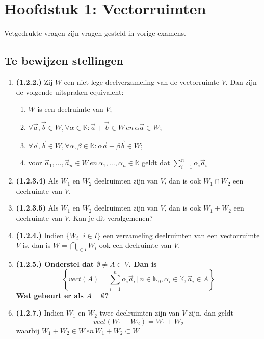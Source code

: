 \documentclass[12pt]{article}
\begin{document}
\date{}    
\maketitle
    \section*{Hoofdstuk 1: Vectorruimten}
    Vetgedrukte vragen zijn vragen gesteld in vorige examens.
    \subsection*{Te bewijzen stellingen}
    \begin{enumerate}
        \item \textbf{(1.2.2.)} Zij $W$ een niet-lege deelverzameling van de vectorruimte $V$. Dan zijn de volgende uitspraken equivalent: \begin{enumerate}
            \item $W$ is een deelruimte van $V$;
            \item $\forall \vec{a},\vec{b} \in W, \forall \alpha \in \mathbb{K}: \vec{a}+\vec{b} \in W \, en \, \alpha \vec{a} \in W$;
            \item $\forall \vec{a},\vec{b} \in W, \forall \alpha , \beta \in \mathbb{K}: \alpha \vec{a} + \beta \vec{b} \in W$;
            \item voor $\vec{a}_1,\dots,\vec{a}_n \in W \, en \, \alpha_1,\dots,\alpha_n \in \mathbb{K}$ geldt dat $\sum^n_{i=1}\alpha_i\vec{a}_i$
        \end{enumerate}
        \item \textbf{(1.2.3.4)} Als $W_1$ en $W_2$ deelruimten zijn van $V$, dan is ook $W_1 \cap W_2$ een deelruimte van $V$.
        \item \textbf{(1.2.3.5)} Als $W_1$ en $W_2$ deelruimten zijn van $V$, dan is ook $W_1 + W_2$ een deelruimte van $V$. Kan je dit veralgemenen?
        \item \textbf{(1.2.4.)} Indien $\{ W_i \, | \, i \in I\}$ een verzameling deelruimten van een vectorruimte $V$ is, dan is $W=\bigcap_{i \in I}W_i$ ook een deelruimte van $V$.
        \item \textbf{\textbf{(1.2.5.)} Onderstel dat $\emptyset \neq A \subset V$. Dan is $$\left\{ vect(A)= \sum_{i = 1}^n \alpha_i \vec{a}_i \, | \, n \in \mathbb{N}_0 , \alpha_i \in \mathbb{K} , \vec{a}_i \in A\right\}$$ Wat gebeurt er als $A = \emptyset$?}
        \item \textbf{(1.2.7.)} Indien $W_1$ en $W_2$ twee deelruimten zijn van $V$ zijn, dan geldt $$vect(W_1+W_2)=W_1+W_2$$ waarbij $W_1+W_2 \in W \, en \, W_1+W_2 \subset W$ 

\end{enumerate}
\end{document}
